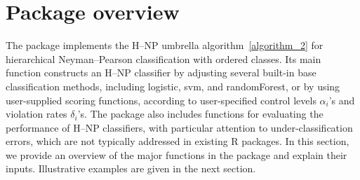 











\section{Package overview}\label{sec:hnp_package}

\noindent
The \href{https://cran.r-project.org/web/packages/HNPclassifier/index.html}{} package implements the H--NP umbrella algorithm~\ref{algorithm_2} for hierarchical Neyman--Pearson classification with ordered classes. Its main function constructs an H--NP classifier by adjusting several built-in base classification methods, including logistic, svm, and randomForest, or by using user-supplied scoring functions, according to user-specified control levels \(\alpha_i\)'s and violation rates \(\delta_i\)'s. The package also includes functions for evaluating the performance of H--NP classifiers, with particular attention to under-classification errors, which are not typically addressed in existing R packages. In this section, we provide an overview of the major functions in the package and explain their inputs. Illustrative examples are given in the next section.











